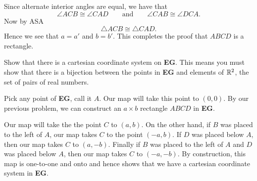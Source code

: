 \documentclass[newpage,hints,handout]{ximera}
\begin{document}
\begin{problem}
\begin{freeResponse}
\begin{image}
\begin{tikzpicture}[geometryDiagrams]
\end{tikzpicture}
\end{image}
Since alternate interior angles are equal, we have that
\[
\angle ACB \cong \angle CAD\qquad\text{and}\qquad \angle CAB \cong \angle DCA.
\]
Now by ASA
\[
\triangle ACB \cong \triangle CAD.
\]
Hence we see that $a = a'$ and $b = b'$. This completes the proof that
$ABCD$ is a rectangle.
\end{freeResponse}
\end{problem}



\begin{problem}
Show that there is a cartesian coordinate system on \textbf{EG}. This
means you must show that there is a bijection between the points in
\textbf{EG} and elements of $\R^2$, the set of pairs of real numbers.

\begin{freeResponse}
Pick any point of \textbf{EG}, call it $A$. Our map will take this
point to $(0,0)$. By our previous problem, we can construct an
$a\times b$ rectangle $ABCD$ in \textbf{EG}.
\begin{image}
\end{image}
Our map will take the the point $C$ to $(a,b)$. On the other hand, if
$B$ was placed to the left of $A$, our map takes $C$ to the point
$(-a,b)$. If $D$ was placed below $A$, then our map takes $C$ to
$(a,-b)$. Finally if $B$ was placed to the left of $A$ and $D$ was
placed below $A$, then our map takes $C$ to $(-a,-b)$.  By
construction, this map is one-to-one and onto and hence shows that we
have a cartesian coordinate system in \textbf{EG}.
\end{freeResponse}

\end{problem}
\end{document}
